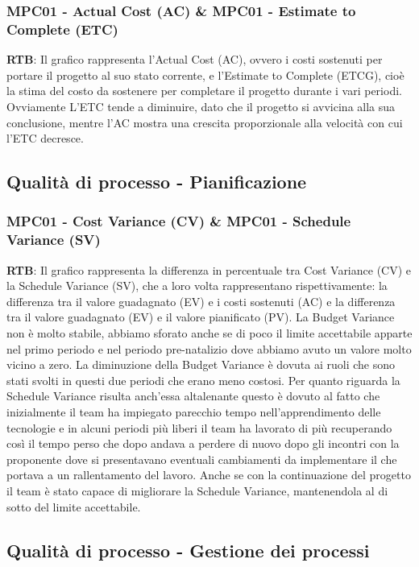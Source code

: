 \documentclass[10pt]{article}
\begin{document}
\begin{justify}
\subsubsection{MPC01 - Actual Cost (AC) \& MPC01 - Estimate to Complete (ETC)}
\textbf{RTB}: Il grafico rappresenta l'Actual Cost (AC), ovvero i costi sostenuti per portare il progetto al suo stato corrente, e l'Estimate to Complete (ETCG), cioè la stima del costo da sostenere per completare il progetto durante i vari periodi. \\
Ovviamente L'ETC tende a diminuire, dato che il progetto si avvicina alla sua conclusione, mentre l'AC mostra una crescita proporzionale alla velocità con cui l'ETC decresce.
\subsection{Qualità di processo - Pianificazione}
\subsubsection{MPC01 - Cost Variance (CV) \& MPC01 - Schedule Variance (SV)}
\textbf{RTB}: Il grafico rappresenta la differenza in percentuale tra Cost Variance (CV) e la Schedule Variance (SV), che a loro volta rappresentano rispettivamente: la differenza tra il valore guadagnato (EV) e i costi sostenuti (AC) e la differenza tra il valore guadagnato (EV) e il valore pianificato (PV). La Budget Variance non è molto stabile, abbiamo sforato anche se di poco il limite accettabile apparte nel primo periodo e nel periodo pre-natalizio dove abbiamo avuto un valore molto vicino a zero. La diminuzione della Budget Variance è dovuta ai ruoli che sono stati svolti in questi due periodi che erano meno costosi. Per quanto riguarda la Schedule Variance risulta anch'essa altalenante questo è dovuto al fatto che inizialmente il team ha impiegato parecchio tempo nell'apprendimento delle tecnologie e in alcuni periodi più liberi il team ha lavorato di più recuperando così il tempo perso che dopo andava a perdere di nuovo dopo gli incontri con la proponente dove si presentavano eventuali cambiamenti da implementare il che portava a un rallentamento del lavoro. Anche se con la continuazione del progetto il team è stato capace di migliorare la Schedule Variance, mantenendola al di sotto del limite accettabile.
\subsection{Qualità di processo - Gestione dei processi}

\end{justify}
\end{document}
